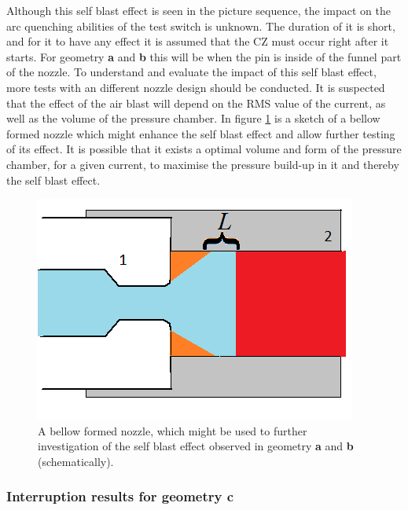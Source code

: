 \documentclass[10pt,b5paper,twoside]{article}
\begin{document}
Although this self blast effect is seen in the picture sequence, the impact on the arc quenching abilities of the test switch is unknown. The duration of it is short, and for it to have any effect it is assumed that the CZ must occur right after it starts. For geometry \textbf{a} and \textbf{b} this will be when the pin is inside of the funnel part of the nozzle. To understand and evaluate the impact of this self blast effect, more tests with an different nozzle design should be conducted. It is suspected that the effect of the air blast will depend on the RMS value of the current, as well as the volume of the pressure chamber. In figure \ref{fig:selfblastChamber} is a sketch of a bellow formed nozzle which might enhance the self blast effect and allow further testing of its effect. It is possible that it exists a optimal volume and form of the pressure chamber, for a given current, to maximise the pressure build-up in it and thereby the self blast effect.

\begin{figure}[H]
\centering
\includegraphics[scale=0.45]{Bilder/Results/nozzle_cooling_2_only_a.png}
\caption{A bellow formed nozzle, which might be used to further investigation of the self blast effect observed in geometry \textbf{a} and \textbf{b} (schematically).} \label{fig:selfblastChamber}
\end{figure}

\subsubsection{Interruption results for geometry \textbf{c}} \label{sec:intTestGeoC}
\end{document}
